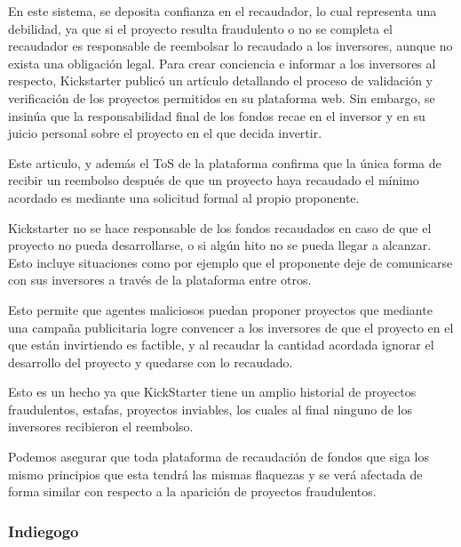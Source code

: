 \bigskip

En este sistema, se deposita confianza en el recaudador, lo cual representa una debilidad, ya que si el proyecto resulta fraudulento o no se completa el recaudador es responsable de reembolsar lo recaudado a los inversores, aunque no exista una obligación legal. Para crear conciencia e informar a los inversores al respecto, Kickstarter publicó un artículo\cite{BibEntry2023Jan} detallando el proceso de validación y verificación de los proyectos permitidos en su plataforma web. Sin embargo, se insinúa que la responsabilidad final de los fondos recae en el inversor y en su juicio personal sobre el proyecto en el que decida invertir.

\bigskip

Este articulo, y además el ToS de la plataforma confirma que la única forma de recibir un reembolso después de que un proyecto haya recaudado el mínimo acordado es mediante una solicitud formal al propio proponente.

\bigskip

Kickstarter no se hace responsable de los fondos recaudados en caso de que el proyecto no pueda desarrollarse, o si algún hito no se pueda llegar a alcanzar. Esto incluye situaciones como por ejemplo que el proponente deje de comunicarse con sus inversores a través de la plataforma entre otros.

\bigskip

Esto permite que agentes maliciosos puedan proponer proyectos que mediante una campaña publicitaria logre convencer a los inversores de que el proyecto en el que están invirtiendo es factible, y al recaudar la cantidad acordada ignorar el desarrollo del proyecto y quedarse con lo recaudado.

\bigskip

Esto es un hecho ya que KickStarter tiene un amplio historial de proyectos fraudulentos, estafas, proyectos inviables, los cuales al final ninguno de los inversores recibieron el reembolso.\cite{kscam1}\cite{kscam2}\cite{kscam3}\cite{kscam4}\cite{kscam5}

\bigskip

Podemos asegurar que toda plataforma de recaudación de fondos que siga los mismo principios que esta tendrá las mismas flaquezas y se verá afectada de forma similar con respecto a la aparición de proyectos fraudulentos.

\subsubsection{Indiegogo}

